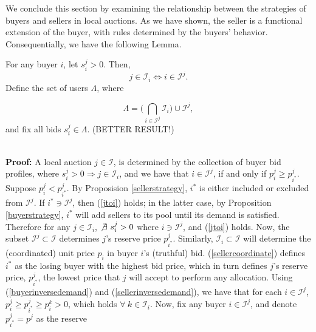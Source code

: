 \documentclass[12pt]{article}
\theoremstyle{definition}
\newcommand{\mcI}{\mathcal{I}}
\begin{document}
\begin{multicols}{2}
We conclude this section by examining the relationship between the strategies of buyers and
sellers in local auctions. As we have shown, the seller
is a functional extension of the buyer, with rules determined by the buyers'
behavior. Consequentially, we have the following Lemma.

{
\label{userunion}
For any buyer $i$, let $s_i^j > 0$.
Then, 
\begin{equation}\label{jtoi}
j\in\mcI_i \Leftrightarrow i\in\mcI^j.
\end{equation}
Define the set of users $\Lambda$, where
\iffalse
\begin{equation}\label{lambda}
    \Lambda_i = \bigg(\displaystyle\bigcap_{j\in\mcI_i} \mcI^j \bigg) \cup \mcI_i,
\end{equation}
$$
     \mcI_i \cup (\mcI^j \cap \mcI^k) = (\mcI_i \cup \mcI^j) \cap (\mcI_i \cup
\mcI^k)
$$
$$
     \mcI^j \cup (\mcI_i \cap \mcI_k) = (\mcI_i \cup \mcI^j) \cap (\mcI_k \cup
\mcI^j)
$$
and
\fi
\begin{equation}\label{lambda}
    \Lambda = \bigg(\displaystyle\bigcap_{i\in\mcI^j} \mcI_i \bigg) \cup \mcI^j,
\end{equation}
and fix all bids $s_i^j \in \Lambda$.
(BETTER RESULT!)
}\\
\textbf{Proof:}
A local auction $j\in\mcI$, is determined by the collection of buyer bid
profiles, where $s_i^j > 0 \Rightarrow j\in\mcI_i$, and we have that $i\in\mcI^j$,
if and only if $p_i^j \ge p_{i^*}^j$.
Suppose $p_i^j < p_{i^*}^j$. By Proposision \ref{sellerstrategy}, $i^*$ is either included or excluded from $\mcI^j$. 
If $i^* \ni \mcI^j$, then (\ref{jtoi}) holds; in the latter case, by
Proposition \ref{buyerstrategy}, $i^*$
will add sellers to its pool until its demand is satisfied. Therefore for any
$j\in\mcI_i$, $\not\exists \ s_i^j > 0$ where $i \ni \mcI^j$, and (\ref{jtoi})
holds.
Now, the subset $\mcI^j \subset \mcI$
determines $j$'s reserve price $p_{i^*}^j$. Similarly, $\mcI_i\subset \mcI$ 
will determine the (coordinated) unit price $p_{i}$ in buyer $i$'s (truthful) bid.
(\ref{sellercoordinate}) defines $i^*$ as the losing buyer with the highest bid
price, which in turn defines $j$'s reserve price, $p_{i^*}^j$,
the lowest price that $j$ will accept to perform any allocation.
Using (\ref{buyerinversedemand}) and (\ref{sellerinversedemand}),
we have that for each $i \in \mcI^j$, 
$p_{i}^j \ge p_{i^*}^j \ge p_i^k > 0$, which holds $\forall \ k \in\mcI_i$.
Now, fix any buyer $i\in\mcI^j$, and denote $p_{i^*}^j = p^j$ as the reserve

\end{multicols}
\end{document}
